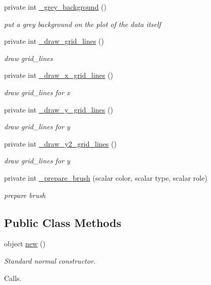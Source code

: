 \begin{DoxyCompactItemize}
private int \hyperlink{classChart_1_1Base_a8bae7e38a6e77c0696f2ef8b06791caa}{\_\-grey\_\-background} ()
\begin{DoxyCompactList}\small\item\em put a grey background on the plot of the data itself \item\end{DoxyCompactList}\item 
private int \hyperlink{classChart_1_1Base_a379e60b338fb8858ce705bdc0e5630fb}{\_\-draw\_\-grid\_\-lines} ()
\begin{DoxyCompactList}\small\item\em draw grid\_\-lines \item\end{DoxyCompactList}\item 
private int \hyperlink{classChart_1_1Base_afb41d27247195ea502c6f5a2d8e21eb6}{\_\-draw\_\-x\_\-grid\_\-lines} ()
\begin{DoxyCompactList}\small\item\em draw grid\_\-lines for x \item\end{DoxyCompactList}\item 
private int \hyperlink{classChart_1_1Base_aac178efe7b3c275cd18fe3c86b4d7a6f}{\_\-draw\_\-y\_\-grid\_\-lines} ()
\begin{DoxyCompactList}\small\item\em draw grid\_\-lines for y \item\end{DoxyCompactList}\item 
private int \hyperlink{classChart_1_1Base_af174cccca9ebbc23f588b6587e88fa1b}{\_\-draw\_\-y2\_\-grid\_\-lines} ()
\begin{DoxyCompactList}\small\item\em draw grid\_\-lines for y \item\end{DoxyCompactList}\item 
private int \hyperlink{classChart_1_1Base_ab86fa8ba6e10d109bd155bfefdb42ebf}{\_\-prepare\_\-brush} (scalar color, scalar type, scalar role)
\begin{DoxyCompactList}\small\item\em prepare brush \item\end{DoxyCompactList}\end{DoxyCompactItemize}
\subsection*{Public Class Methods}
\label{_amgrp76489900c371cf7d2ca502e43fa26e8e}
 \begin{DoxyCompactItemize}
\item 
object \hyperlink{classChart_1_1Base_a73931fdf090999a07299c1b42d23ae9d}{new} ()
\begin{DoxyCompactList}\small\item\em Standard normal constructor.\par
 Calls. \item\end{DoxyCompactList}\end{DoxyCompactItemize}
